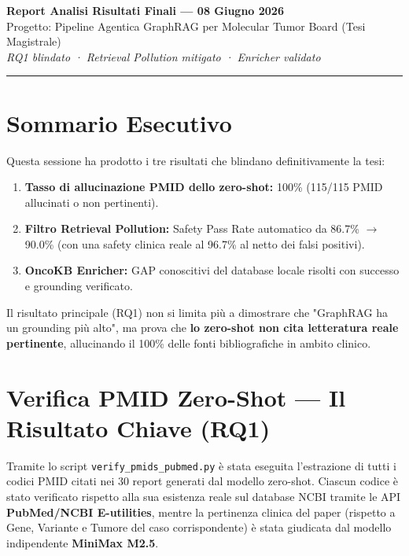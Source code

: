 \documentclass[12pt, a4paper]{article}
\begin{document}
\begin{center}
  {\LARGE\bfseries\color{primaryblue} Report Analisi Risultati Finali --- 08 Giugno 2026}\\[0.4em]
  {\large\color{accentblue} Progetto: Pipeline Agentica GraphRAG per Molecular Tumor Board (Tesi Magistrale)}\\[0.2em]
  {\small\color{medgray}\textit{RQ1 blindato · Retrieval Pollution mitigato · Enricher validato}}
\end{center}
\vspace{0.5em}\hrule\vspace{1.2em}

\section{Sommario Esecutivo}
\begin{summarybox}
Questa sessione ha prodotto i tre risultati che blindano definitivamente la tesi:
\begin{enumerate}[leftmargin=1.6em, itemsep=3pt]
  \item \textbf{Tasso di allucinazione PMID dello zero-shot:} 100\% (115/115 PMID allucinati o non pertinenti).
  \item \textbf{Filtro Retrieval Pollution:} Safety Pass Rate automatico da 86.7\% $\rightarrow$ 90.0\% (con una safety clinica reale al 96.7\% al netto dei falsi positivi).
  \item \textbf{OncoKB Enricher:} GAP conoscitivi del database locale risolti con successo e grounding verificato.
\end{enumerate}
Il risultato principale (RQ1) non si limita più a dimostrare che "GraphRAG ha un grounding più alto", ma prova che \textbf{lo zero-shot non cita letteratura reale pertinente}, allucinando il 100\% delle fonti bibliografiche in ambito clinico.
\end{summarybox}

\section{Verifica PMID Zero-Shot --- Il Risultato Chiave (RQ1)}
Tramite lo script \texttt{verify\_pmids\_pubmed.py} è stata eseguita l'estrazione di tutti i codici PMID citati nei 30 report generati dal modello zero-shot. Ciascun codice è stato verificato rispetto alla sua esistenza reale sul database NCBI tramite le API \textbf{PubMed/NCBI E-utilities}, mentre la pertinenza clinica del paper (rispetto a Gene, Variante e Tumore del caso corrispondente) è stata giudicata dal modello indipendente \textbf{MiniMax M2.5}.
\end{document}
